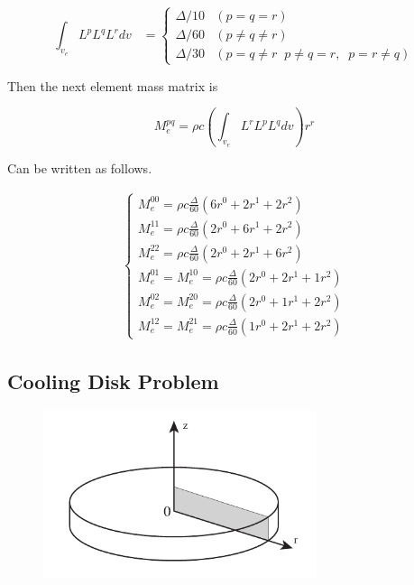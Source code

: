 \begin{equation}
\int_{v_e} L^pL^qL^r dv \;\;\;= 
\left\{\begin{array}{ll}\Delta/10 & (p=q=r)\\ 
\Delta/60 & (p\ne q\ne r)\\ 
\Delta/30 & (p=q\ne r\;\;p\ne q=r,\;\;p=r\ne q) \end{array}\right.
\end{equation}



Then the next element mass matrix is

\begin{equation}
M_e^{pq}=\rho c \left(\int_{v_e} L^rL^pL^q dv\right) r^r
\end{equation}

Can be written as follows.

\begin{eqnarray}
\left\{\begin{array}{l}M_e^{00} = \rho c \frac{\Delta}{60} (6r^0+2r^1+2r^2)\\    M_e^{11} = \rho c \frac{\Delta}{60} (2r^0+6r^1+2r^2)\\   M_e^{22} = \rho c \frac{\Delta}{60} (2r^0+2r^1+6r^2)\\    M_e^{01} = M_e^{10} = \rho c \frac{\Delta}{60} (2r^0+2r^1+1r^2)\\    M_e^{02} = M_e^{20} = \rho c \frac{\Delta}{60} (2r^0+1r^1+2r^2)\\    M_e^{12} = M_e^{21} = \rho c \frac{\Delta}{60} (1r^0+2r^1+2r^2)\end{array}\right.
\end{eqnarray}




\subsection{Cooling Disk Problem}

\begin{figure}[htbp!]
\center
\includegraphics[width=80mm]{images/disc.pdf}
\end{figure}

